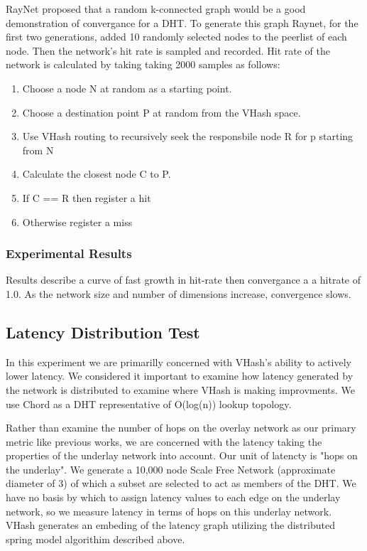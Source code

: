 \documentclass{IEEEtran}
\begin{document}
RayNet proposed that a random k-connected graph would be a good demonstration of convergance for a DHT.
To generate this graph Raynet, for the first two generations, added 10 randomly selected nodes to the peerlist of each node.
Then the network's hit rate is sampled and recorded.
Hit rate of the network is calculated by taking taking 2000 samples as follows:
\begin{enumerate}
            \item{Choose a node N at random as a starting point.}
            \item{Choose a destination point P at random from the VHash space.}
            \item{Use VHash routing to recursively seek the responsbile node R for p starting from N}
            \item{Calculate the closest node C to P.}
            \item{If C == R then register a hit}
            \item{Otherwise register a miss}
\end{enumerate}

\subsubsection{Experimental Results}
Results describe a curve of fast growth in hit-rate then convergance a a hitrate of 1.0.
As the network size and number of dimensions increase, convergence slows.


\subsection{Latency Distribution Test}
In this experiment we are primarilly concerned with VHash's ability to actively lower latency.
We considered it important to examine how latency generated by the network is distributed to examine where VHash is making improvments.
We use Chord as a DHT representative of O(log(n)) lookup topology.

Rather than examine the number of hops on the overlay network as our primary metric like previous works, we are concerned with the latency taking the properties of the underlay network into account.
Our unit of latencty is "hops on the underlay".
We generate a 10,000 node Scale Free Network (approximate diameter of 3) of which a subset are selected to act as members of the DHT.
We have no basis by which to assign latency values to each edge on the underlay network, so we measure latency in terms of hops on this underlay network.
VHash generates an embeding of the latency graph utilizing the distributed spring model algorithim described above.
\end{document}
